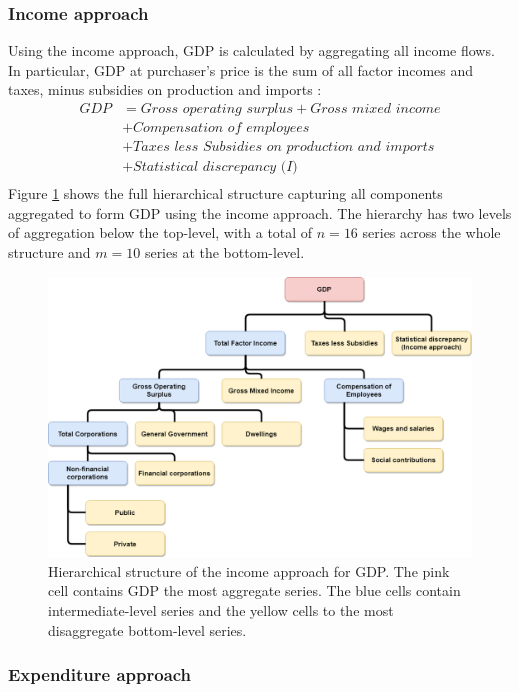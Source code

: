 \documentclass[graybox]{svmult}
\begin{document}
\subsubsection*{Income approach}

Using the income approach, GDP is calculated by aggregating all income flows. In particular, GDP at purchaser's price is the sum of all factor incomes and taxes, minus subsidies on production and imports \citep{ABS2015}:
	\begin{align*}
	\textit{GDP} &= \textit{Gross operating surplus}+ \textit{Gross mixed income}\\& + \textit{Compensation of employees} \\& + \textit{Taxes less Subsidies on production and imports} \\& + \textit{Statistical discrepancy (I)}\\
	\end{align*}
Figure \ref{fig:GDP_I} shows the full hierarchical structure capturing all components aggregated to form GDP using the income approach. The hierarchy has two levels of aggregation below the top-level, with a total of $n=16$ series across the whole structure and $m=10$ series at the bottom-level.

\begin{figure}[t]
	\centering
	\includegraphics[width=\textwidth]{Figs/IncomeApproach.png}
	\caption{Hierarchical structure of the income approach for GDP. The pink cell contains GDP the most aggregate series. The blue cells contain intermediate-level series and the yellow cells to the most disaggregate bottom-level series.}\label{fig:GDP_I}
\end{figure}

\subsubsection*{Expenditure approach}
\end{document}
